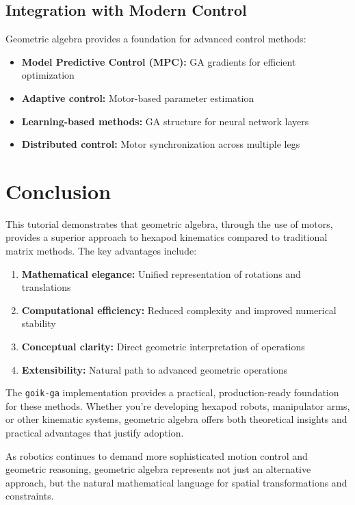 \documentclass[11pt]{article}
\begin{document}
\subsection{Integration with Modern Control}

Geometric algebra provides a foundation for advanced control methods:
\begin{itemize}
    \item \textbf{Model Predictive Control (MPC):} GA gradients for efficient optimization
    \item \textbf{Adaptive control:} Motor-based parameter estimation
    \item \textbf{Learning-based methods:} GA structure for neural network layers
    \item \textbf{Distributed control:} Motor synchronization across multiple legs
\end{itemize}

\section{Conclusion}

This tutorial demonstrates that geometric algebra, through the use of motors, provides a superior approach to hexapod kinematics compared to traditional matrix methods. The key advantages include:

\begin{enumerate}
    \item \textbf{Mathematical elegance:} Unified representation of rotations and translations
    \item \textbf{Computational efficiency:} Reduced complexity and improved numerical stability  
    \item \textbf{Conceptual clarity:} Direct geometric interpretation of operations
    \item \textbf{Extensibility:} Natural path to advanced geometric operations
\end{enumerate}

The \texttt{goik-ga} implementation provides a practical, production-ready foundation for these methods. Whether you're developing hexapod robots, manipulator arms, or other kinematic systems, geometric algebra offers both theoretical insights and practical advantages that justify adoption.

As robotics continues to demand more sophisticated motion control and geometric reasoning, geometric algebra represents not just an alternative approach, but the natural mathematical language for spatial transformations and constraints.



\end{document}
